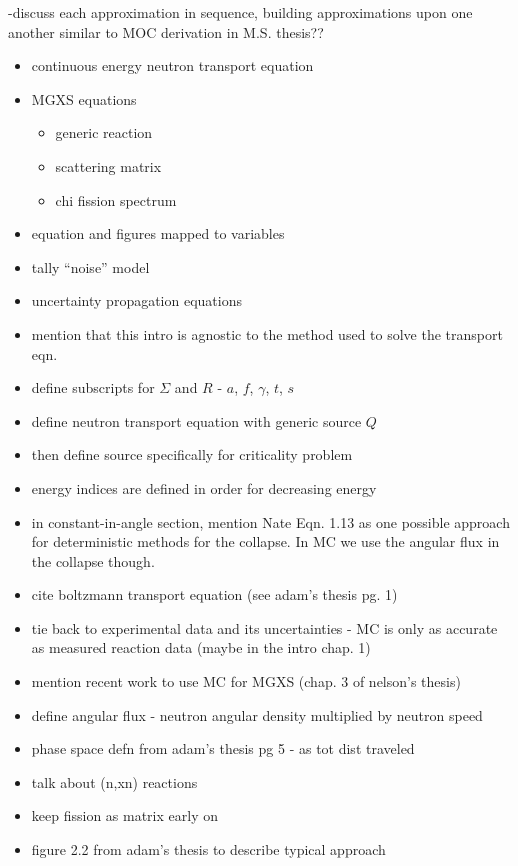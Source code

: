 


-discuss each approximation in sequence, building approximations upon one another similar to \ac{MOC} derivation in M.S. thesis??

\begin{itemize}[noitemsep]
  \item continuous energy neutron transport equation
  \item \ac{MGXS} equations
  \begin{itemize}[noitemsep]
    \item generic reaction
    \item scattering matrix
    \item chi fission spectrum
  \end{itemize}
  \item equation and figures mapped to variables
  \item tally ``noise'' model
  \item uncertainty propagation equations
  \item mention that this intro is agnostic to the method used to solve the transport eqn.
   \item define subscripts for $\Sigma$ and $R$ - $a$, $f$, $\gamma$, $t$, $s$
   \item define neutron transport equation with generic source $Q$
   \item then define source specifically for criticality problem
   \item energy indices are defined in order for decreasing energy
   \item in constant-in-angle section, mention Nate Eqn. 1.13 as one possible approach for deterministic methods for the collapse. In MC we use the angular flux in the collapse though.
   \item cite boltzmann transport equation (see adam's thesis pg. 1) 
   \item tie back to experimental data and its uncertainties - MC is only as accurate as measured reaction data (maybe in the intro chap. 1)
   \item mention recent work to use MC for MGXS (chap. 3 of nelson's thesis)
   \item define angular flux - neutron angular density multiplied by neutron speed
   \item phase space defn from adam's thesis pg 5 - as tot dist traveled
   \item talk about (n,xn) reactions
   \item keep fission as matrix early on
   \item figure 2.2 from adam's thesis to describe typical approach
\end{itemize}



